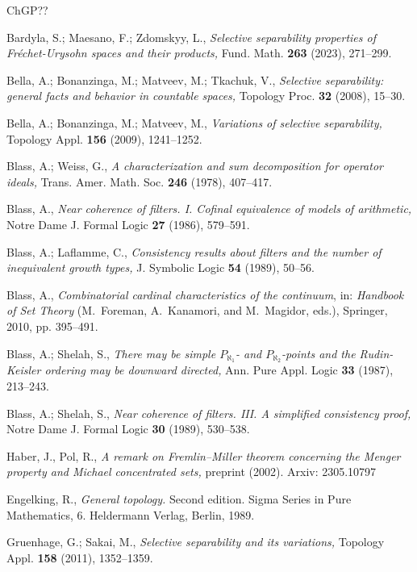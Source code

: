 \documentclass[12pt,a4paper]{amsart}
\theoremstyle{definition}
\begin{document}
\begin{thebibliography}{ChGP??}

Bardyla, S.; Maesano, F.; Zdomskyy, L., {\it Selective separability properties of Fr\'{e}chet-Urysohn spaces and their products,} Fund. Math. \textbf{263} (2023), 271--299. 


 Bella, A.; Bonanzinga, M.; Matveev, M.; Tkachuk, V.,
{\it Selective separability: general facts and behavior in countable spaces,}
Topology Proc. \textbf{32} (2008), 15--30.


 Bella, A.;  Bonanzinga, M.;  Matveev, M., {\it Variations of selective 
 separability,} Topology Appl. \textbf{156} (2009),  1241--1252.

Blass, A.;  Weiss, G., {\it A characterization and sum decomposition for operator ideals,} Trans. Amer. Math. Soc. {\bf 246} (1978), 407--417.

Blass, A., {\it Near coherence of filters. I. Cofinal equivalence of models of arithmetic,} Notre Dame J. Formal Logic {\bf 27} (1986),  579--591.

Blass, A.;  Laflamme, C., {\it Consistency results about filters and the number of inequivalent growth types,} J. Symbolic Logic {\bf 54} (1989),  50--56.

Blass, A.,
\emph{Combinatorial cardinal characteristics of the continuum},
in: \textit{Handbook of Set Theory} (M.\ Foreman, A.\ Kanamori, and M.\ Magidor, eds.),
Springer, 2010, pp. 395--491.

Blass, A.; Shelah, S., {\it There may be simple $P_{\aleph_1}$- and $P_{\aleph_2}$-points and the Rudin-Keisler ordering may be downward directed,} Ann. Pure Appl. Logic \textbf{33} (1987), 213--243.

Blass, A.; Shelah, S., {\it Near coherence of filters. III. A simplified consistency
proof,} Notre Dame J. Formal Logic \textbf{30} (1989), 530--538.

Haber, J., Pol, R.,  {\it A remark on Fremlin–Miller theorem concerning the Menger property and
Michael concentrated sets,} preprint (2002).
Arxiv: 2305.10797



 Engelking, R., {\it General topology.}
  Second edition.
 Sigma Series in Pure Mathematics,
 6. Heldermann Verlag, Berlin, 1989.

Gruenhage, G.;  Sakai, M., {\it Selective separability and its variations,}
Topology Appl. \textbf{158} (2011),  1352--1359.



\end{thebibliography}
\end{document}
